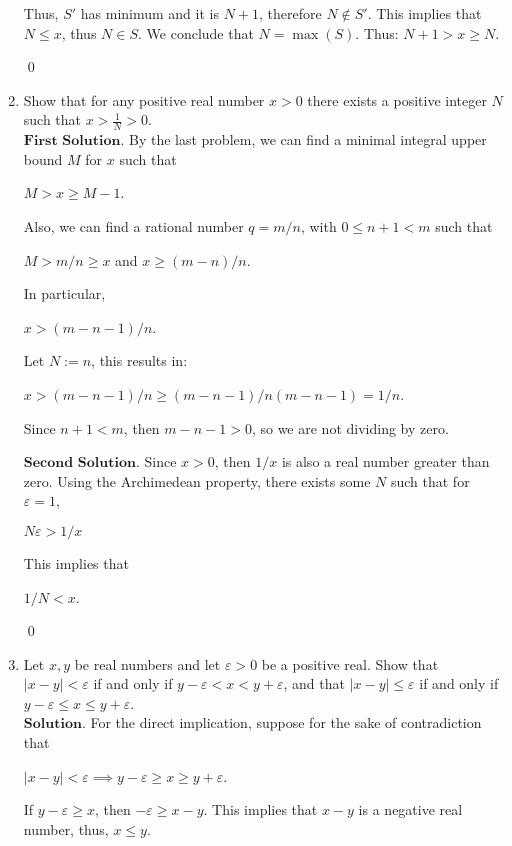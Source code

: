 \documentclass{article}
\theoremstyle{remark}
\begin{document}
\begin{enumerate}
        Thus, $S'$ has minimum and it is $N+1$, therefore $N \notin S'$. This implies that $N \leq x$, thus $N \in S$.
        We conclude that $N = \max(S)$.
        Thus: $N+1 > x \geq N$.
        \begin{flushright}
            \qed
        \end{flushright}
        \item Show that for any positive real number \( x > 0 \) there exists a positive integer \( N \) such that \( x > \frac{1}{N} > 0 \).\\
        $\textbf{First Solution.}$ By the last problem, we can find a minimal integral upper bound $M$ for $x$ such that
        \begin{center}
            $M > x \geq M-1$.
        \end{center}
        Also, we can find a rational number $q = m/n$, with $0 \leq n+1 < m$ such that 
        \begin{center}
            $M > m/n \geq x$ and $x \geq (m-n)/n$.
        \end{center}
        In particular,
        \begin{center}
            $x > (m-n-1)/n$.
        \end{center}
        Let $N := n$, this results in:
        \begin{center}
            $x > (m-n-1)/n \geq (m-n-1)/n(m-n-1) = 1/n$.
        \end{center}
        Since $n+1 < m$, then $m-n-1 > 0$, so we are not dividing by zero.

        $\textbf{Second Solution.}$
        Since $x>0$, then $1/x$ is also a real number greater than zero.
        Using the Archimedean property, there exists some $N$ such that for $\varepsilon = 1$,
        \begin{center}
            $N\varepsilon > 1/x$
        \end{center}
        This implies that 
        \begin{center}
            $1/N < x$.
        \end{center}
        \begin{flushright}
            \qed
        \end{flushright}
        \item Let \( x, y \) be real numbers and let \( \varepsilon > 0 \) be a positive real. 
        Show that \( |x - y| < \varepsilon \) if and only if \( y - \varepsilon < x < y + \varepsilon \), 
        and that \( |x - y| \leq \varepsilon \) if and only if \( y - \varepsilon \leq x \leq y + \varepsilon \).\\
        $\textbf{Solution.}$
        For the direct implication, suppose for the sake of contradiction that 
        \begin{center}
            $\vert x - y \vert < \varepsilon \implies y-\varepsilon \geq x \geq y + \varepsilon$.
        \end{center}
        If $y-\varepsilon \geq x$, then $-\varepsilon \geq x-y$. This implies that $x-y$ is a negative real number,
        thus, $x \leq y$.


\end{enumerate}
\end{document}
